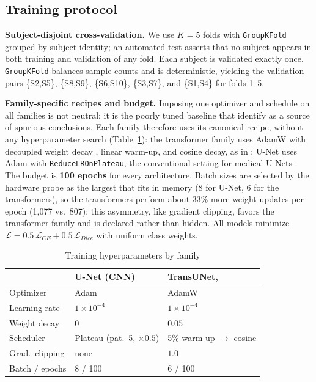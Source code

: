 \subsection{Training protocol} \label{subsec:recipes_otimizacao}

\textbf{Subject-disjoint cross-validation.}
We use $K=5$ folds with \texttt{GroupKFold} grouped by subject identity; an automated test asserts that no subject appears in both training and validation of any fold.
Each subject is validated exactly once.
\texttt{GroupKFold} balances sample counts and is deterministic, yielding the validation pairs \{S2,S5\}, \{S8,S9\}, \{S6,S10\}, \{S3,S7\}, and \{S1,S4\} for folds 1--5.

\textbf{Family-specific recipes and budget.}
Imposing one optimizer and schedule on all families is not neutral; it is the poorly tuned baseline that \cite{Isensee2024} identify as a source of spurious conclusions.
Each family therefore uses its canonical recipe, without any hyperparameter search (Table~\ref{tab:hiperparametros}): the transformer family uses AdamW with decoupled weight decay \cite{Loshchilov2019}, linear warm-up, and cosine decay, as in \cite{Liu2021Swin}; U-Net uses Adam with \texttt{ReduceLROnPlateau}, the conventional setting for medical U-Nets \cite{Siddique2021}.
The budget is \textbf{100 epochs} for every architecture.
Batch sizes are selected by the hardware probe as the largest that fits in memory (8 for U-Net, 6 for the transformers), so the transformers perform about $33\%$ more weight updates per epoch (1{,}077 vs.\ 807); this asymmetry, like gradient clipping, favors the transformer family and is declared rather than hidden.
All models minimize $\mathcal{L}=0.5\,\mathcal{L}_{CE}+0.5\,\mathcal{L}_{Dice}$ \cite{Milletari2016,Sudre2017,Jadon2020} with uniform class weights.

\begin{table}[tbp]
\centering
\caption{Training hyperparameters by family}
\label{tab:hiperparametros}
\footnotesize
\setlength{\tabcolsep}{3pt}
\begin{tabular}{@{}lll@{}}
\toprule
 & \textbf{U-Net (CNN)} & \textbf{TransUNet, \swint{}} \\
\midrule
Optimizer & Adam & AdamW \\
Learning rate & $1{\times}10^{-4}$ & $1{\times}10^{-4}$ \\
Weight decay & $0$ & $0.05$ \\
Scheduler & Plateau (pat.\ 5, $\times0.5$) & 5\% warm-up $\rightarrow$ cosine \\
Grad.\ clipping & none & $1.0$ \\
Batch / epochs & 8 / 100 & 6 / 100 \\
\bottomrule
\end{tabular}
\end{table}

